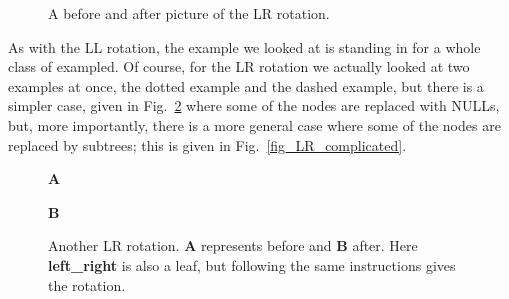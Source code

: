 \documentclass[11pt,a4paper]{scrartcl}
\begin{document}
\begin{figure}
\begin{center}
\qquad
{}
\end{center}
\caption{A before and after picture of the LR rotation.\label{fig_LR_4}}
\end{figure}



As with the LL rotation, the example we looked at is standing in for a
whole class of exampled. Of course, for the LR rotation we actually
looked at two examples at once, the dotted example and the dashed
example, but there is a simpler case, given in
Fig.~\ref{fig_LR_simple} where some of the nodes are replaced with
NULLs, but, more importantly, there is a more general case where some
of the nodes are replaced by subtrees; this is given in
Fig.~\ref{fig_LR_complicated}.


\begin{figure}
{\bf A}
\begin{center}
\end{center}
{\bf B}
\begin{center}
\end{center}
\caption{Another LR rotation. {\bf A} represents before and {\bf B}
  after. Here {\bf left\_right} is also a leaf, but following the same
  instructions gives the rotation.\label{fig_LR_simple}}
\end{figure}
\end{document}
